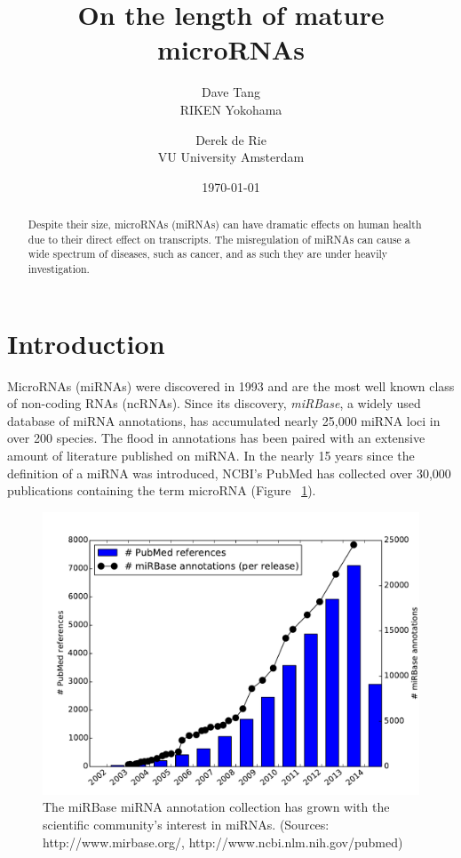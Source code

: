 \documentclass{article}
\title{On the length of mature microRNAs}
\author{Dave Tang  \\
	RIKEN Yokohama \\
	\and 
	Derek de Rie \\
	VU University Amsterdam \\
	}
\date{\today}
\begin{document}
\maketitle

\begin{abstract}
Despite their size, microRNAs (miRNAs) can have dramatic effects on human health due to their direct effect on transcripts. The misregulation of miRNAs can cause a wide spectrum of diseases, such as cancer, and as such they are under heavily investigation.

\end{abstract}

\section{Introduction}
MicroRNAs (miRNAs) were discovered in 1993\cite{pmid8252621} and are the most well known class of non-coding RNAs (ncRNAs). Since its discovery, \emph{miRBase}, a widely used database of miRNA annotations, has accumulated nearly 25,000 miRNA loci in over 200 species. The flood in annotations has been paired with an extensive amount of literature published on miRNA. In the nearly 15 years since the definition of a miRNA was introduced, NCBI's PubMed has collected over 30,000 publications containing the term microRNA (Figure ~\ref{fig:mirna_history}).

\begin{figure}
   \centering
      \includegraphics[width=\textwidth,natwidth=100,natheight=100]{image/mirna_history.pdf}
      \caption{The miRBase miRNA annotation collection has grown with the scientific community's interest in miRNAs. (Sources: http://www.mirbase.org/, http://www.ncbi.nlm.nih.gov/pubmed)}
      \label{fig:mirna_history}
\end{figure}
\end{document}

